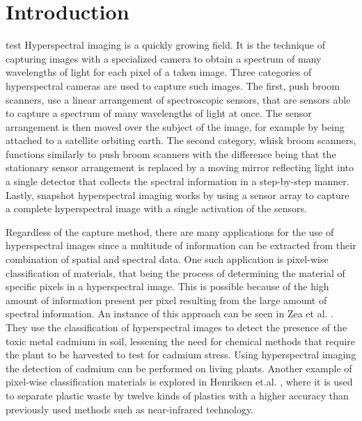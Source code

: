 \chapter{Introduction\label{cha:chapter1}}test
Hyperspectral imaging is a quickly growing field. It is the technique of capturing images with a specialized camera to obtain a spectrum of many wavelengths of light for each pixel of a taken image. Three categories of hyperspectral cameras are used to capture such images. The first, push broom scanners, use a linear arrangement of spectroscopic sensors, that are sensors able to capture a spectrum of many wavelengths of light at once. The sensor arrangement is then moved over the subject of the image, for example by being attached to a satellite orbiting earth. The second category, whisk broom scanners, functions similarly to push broom scanners with the difference being that the stationary sensor arrangement is replaced by a moving mirror reflecting light into a single detector that collects the spectral information in a step-by-step manner. Lastly, snapshot hyperspectral imaging works by using a sensor array to capture a complete hyperspectral image with a single activation of the sensors. 

Regardless of the capture method, there are many applications for the use of hyperspectral images since a multitude of information can be extracted from their combination of spatial and spectral data. One such application is pixel-wise classification of materials, that being the process of determining the material of specific pixels in a hyperspectral image. This is possible because of the high amount of information present per pixel resulting from the large amount of spectral information. An instance of this approach can be seen in Zea et al. \citep{zea_leveraging_2022}. They use the classification of hyperspectral images to detect the presence of the toxic metal cadmium in soil, lessening the need for chemical methods that require the plant to be harvested to test for cadmium stress. Using hyperspectral imaging the detection of cadmium can be performed on living plants. Another example of pixel-wise classification materials is explored in Henriksen et.al. \citep{henriksen_plastic_2022}, where it is used to separate plastic waste by twelve kinds of plastics with a higher accuracy than previously used methods such as near-infrared technology.

